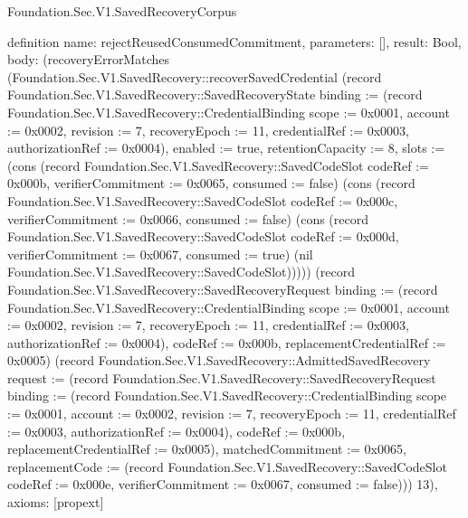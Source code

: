 \begin{lexlean}{Foundation.Sec.V1.SavedRecoveryCorpus}
\begin{semanticmodule}
definition{
  name: rejectReusedConsumedCommitment,
  parameters: [],
  result: Bool,
  body: (recoveryErrorMatches (Foundation.Sec.V1.SavedRecovery::recoverSavedCredential (record Foundation.Sec.V1.SavedRecovery::SavedRecoveryState {binding := (record Foundation.Sec.V1.SavedRecovery::CredentialBinding {scope := 0x0001, account := 0x0002, revision := 7, recoveryEpoch := 11, credentialRef := 0x0003, authorizationRef := 0x0004}), enabled := true, retentionCapacity := 8, slots := (cons (record Foundation.Sec.V1.SavedRecovery::SavedCodeSlot {codeRef := 0x000b, verifierCommitment := 0x0065, consumed := false}) (cons (record Foundation.Sec.V1.SavedRecovery::SavedCodeSlot {codeRef := 0x000c, verifierCommitment := 0x0066, consumed := false}) (cons (record Foundation.Sec.V1.SavedRecovery::SavedCodeSlot {codeRef := 0x000d, verifierCommitment := 0x0067, consumed := true}) (nil Foundation.Sec.V1.SavedRecovery::SavedCodeSlot))))}) (record Foundation.Sec.V1.SavedRecovery::SavedRecoveryRequest {binding := (record Foundation.Sec.V1.SavedRecovery::CredentialBinding {scope := 0x0001, account := 0x0002, revision := 7, recoveryEpoch := 11, credentialRef := 0x0003, authorizationRef := 0x0004}), codeRef := 0x000b, replacementCredentialRef := 0x0005}) (record Foundation.Sec.V1.SavedRecovery::AdmittedSavedRecovery {request := (record Foundation.Sec.V1.SavedRecovery::SavedRecoveryRequest {binding := (record Foundation.Sec.V1.SavedRecovery::CredentialBinding {scope := 0x0001, account := 0x0002, revision := 7, recoveryEpoch := 11, credentialRef := 0x0003, authorizationRef := 0x0004}), codeRef := 0x000b, replacementCredentialRef := 0x0005}), matchedCommitment := 0x0065, replacementCode := (record Foundation.Sec.V1.SavedRecovery::SavedCodeSlot {codeRef := 0x000e, verifierCommitment := 0x0067, consumed := false})})) 13),
  axioms: [propext]
}


\end{semanticmodule}
\end{lexlean}

